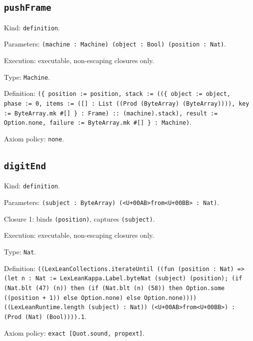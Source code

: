 \documentclass[11pt]{article}
\begin{document}
\subsection*{\texttt{pushFrame}}
\noindent Kind: \texttt{definition}.\par
\noindent Parameters: \texttt{(machine : Machine) (object : Bool) (position : Nat)}.\par
\noindent Execution: executable, non-escaping closures only.\par
\noindent Type: \texttt{Machine}.\par
\noindent Definition: \texttt{(\{ position := position, stack := ((\{ object := object, phase := 0, items := ([] : List ((Prod (ByteArray) (ByteArray)))), key := ByteArray.mk \#[] \} : Frame) :: (machine).stack), result := Option.none, failure := ByteArray.mk \#[] \} : Machine)}.\par
\noindent Axiom policy: \texttt{none}.\par
\subsection*{\texttt{digitEnd}}
\noindent Kind: \texttt{definition}.\par
\noindent Parameters: \texttt{(subject : ByteArray) (<U+00AB>from<U+00BB> : Nat)}.\par
\noindent Closure 1: binds \texttt{(position)}, captures \texttt{(subject)}.\par
\noindent Execution: executable, non-escaping closures only.\par
\noindent Type: \texttt{Nat}.\par
\noindent Definition: \texttt{((LexLeanCollections.iterateUntil ((fun (position : Nat) => (let n : Nat := LexLeanKappa.Label.byteNat (subject) (position); (if (Nat.blt (47) (n)) then (if (Nat.blt (n) (58)) then Option.some ((position + 1)) else Option.none) else Option.none)))) ((LexLeanRuntime.length (subject) : Nat)) (<U+00AB>from<U+00BB>) : (Prod (Nat) (Bool)))).1}.\par
\noindent Axiom policy: \texttt{exact [Quot.sound, propext]}.\par
\end{document}
